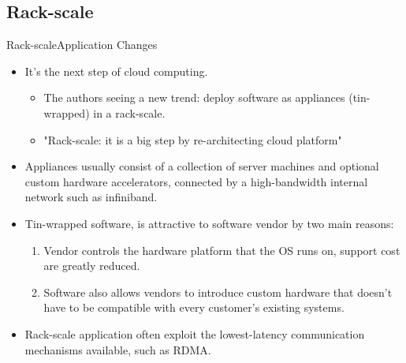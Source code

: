 \documentclass[10pt]{beamer}
\begin{document}
\subsection{Rack-scale}
\begin{frame}{Rack-scale}{Application Changes}
  \begin{itemize}
    \item It's the next step of cloud computing.
    \begin{itemize}
      \item The authors seeing a new trend: deploy software as appliances
            (tin-wrapped) in a rack-scale.
      \item "Rack-scale: it is a big step by re-architecting cloud platform"
    \end{itemize}
    \item Appliances usually consist of a collection of server machines and
          optional custom hardware accelerators, connected by a high-bandwidth
          internal network such as infiniband.
    \item Tin-wrapped software, is attractive to software vendor by two main
          reasons:
      \begin{enumerate}
        \item Vendor controls the hardware platform that the OS runs on,
               support cost are greatly reduced.
        \item Software also allows vendors to introduce custom hardware that
              doesn't have to be compatible with every customer's existing
              systems.
      \end{enumerate}
    \item Rack-scale application often exploit the lowest-latency communication
          mechanisms available, such as RDMA.
  \end{itemize}
\end{frame}

\end{document}
